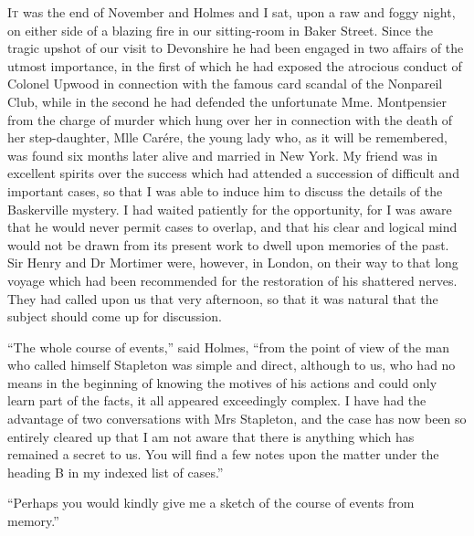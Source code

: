 \documentclass[paper=a5,BCOR=7mm,twoside,DIV=calc,12pt,usegeometry,openany,chapterprefix,endperiod,headings=big]{scrbook} %
\begin{document}
\lettrine[lines=1]{I}{t} was the end of November and Holmes and I sat, upon a raw and foggy night, on either side of a blazing fire in our sitting-room in Baker Street. Since the tragic upshot of our visit to Devonshire he had been engaged in two affairs of the utmost importance, in the first of which he had exposed the atrocious conduct of Colonel Upwood in connection with the famous card scandal of the Nonpareil Club, while in the second he had defended the unfortunate Mme. Montpensier from the charge of murder which hung over her in connection with the death of her step-daughter, Mlle Carére, the young lady who, as it will be re\-mem\-bered, was found six months later alive and married in New York. My friend was in excellent spirits over the success which had attended a succession of difficult and important cases, so that I was able to induce him to discuss the details of the Baskerville mystery. I had waited patiently for the opportunity, for I was aware that he would never permit cases to overlap, and that his clear and logical mind would not be drawn from its present work to dwell upon memories of the past. Sir Henry and Dr Mortimer were, however, in London, on their way to that long voyage which had been recommended for the restoration of his shattered nerves. They had called upon us that very afternoon, so that it was natural that the subject should come up for discussion.



\enquote{The whole course of events,} said Holmes, \enquote{from the point of view of the man who called himself Stapleton was simple and direct, although to us, who had no means in the beginning of knowing the motives of his actions and could only learn part of the facts, it all appeared exceedingly complex. I have had the advantage of two conversations with Mrs Stapleton, and the case has now been so entirely cleared up that I am not aware that there is anything which has remained a secret to us. You will find a few notes upon the matter under the heading B in my indexed list of cases.}

\enquote{Perhaps you would kindly give me a sketch of the course of events from memory.}
\end{document}

